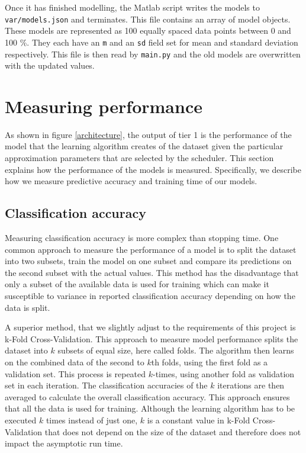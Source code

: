 \documentclass[a4paper,12pt,twoside,openright]{report}
\begin{document}
Once it has finished modelling, the Matlab script writes the models to \texttt{var/models.json} and terminates. This file contains an array of model objects. These models are represented as 100 equally spaced data points between 0 and 100 \%. They each have an \texttt{m} and an \texttt{sd} field set for mean and standard deviation respectively. This file is then read by \texttt{main.py} and the old models are overwritten with the updated values.


\section{Measuring performance}
As shown in figure \ref{architecture}, the output of tier 1 is the performance of the model that the learning algorithm creates of the dataset given the particular approximation parameters that are selected by the scheduler. This section explains how the performance of the models is measured. Specifically, we describe how we measure predictive accuracy and training time of our models.

\subsection{Classification accuracy}

Measuring classification accuracy is more complex than stopping time. One common approach to measure the performance of a model is to split the dataset into two subsets, train the model on one subset and compare its predictions on the second subset with the actual values. This method has the disadvantage that only a subset of the available data is used for training which can make it susceptible to variance in reported classification accuracy depending on how the data is split.

A superior method, that we slightly adjust to the requirements of this project is k-Fold Cross-Validation. This approach to measure model performance splits the dataset into $k$ subsets of equal size, here called folds. The algorithm then learns on the combined data of the second to $k$th folds, using the first fold as a validation set. This process is repeated $k$-times, using another fold as validation set in each iteration. The classification accuracies of the $k$ iterations are then averaged to calculate the overall classification accuracy. This approach ensures that all the data is used for training. Although the learning algorithm has to be executed $k$ times instead of just one, $k$ is a constant value in k-Fold Cross-Validation that does not depend on the size of the dataset and therefore does not impact the asymptotic run time.
\end{document}
